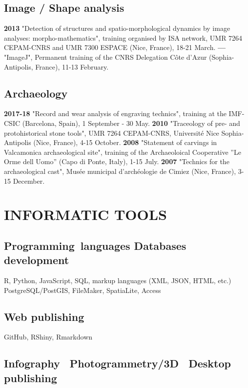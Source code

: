 \documentclass[11pt]{report} %
\begin{document}
\subsection*{Image / Shape analysis}

\textbf{2013 }"Detection of structures and spatio-morphological dynamics by image analyses: morpho-mathematics", training organised by ISA network, UMR 7264 CEPAM-CNRS and UMR 7300 ESPACE (Nice, France), 18-21 March.
\smallbreak
\textbf{---  }"ImageJ", Permanent training of the CNRS Delegation C\^{o}te d'Azur (Sophia-Antipolis, France), 11-13 February.

\subsection*{Archaeology}

\textbf{2017-18 } "Record and wear analysis of engraving technics", training at the IMF-CSIC (Barcelona, Spain), 1 September - 30 May.
\smallbreak
\textbf{2010 } "Traceology of pre- and protohistorical stone tools", UMR 7264 CEPAM-CNRS, Universit\'{e} Nice Sophia-Antipolis (Nice, France), 4-15 October.
\smallbreak
\textbf{2008 } "Statement of carvings in Valcamonica archaeological site", training of the Archaeoloical Cooperative ''Le Orme dell Uomo'' (Capo di Ponte, Italy), 1-15 July.
\smallbreak
\textbf{2007 } "Technics for the archaeological cast", Mus\'{e}e municipal d'arch\'{e}ologie de Cimiez (Nice, France), 3-15 December.

\section*{INFORMATIC TOOLS}

\subsection*{Programming~languages {\textbar} Databases development}

\textsf{R}, \textsf{Python}, \textsf{JavaScript}, SQL, markup languages (XML, JSON, HTML, etc.)~\textbf{{\textbar}} PostgreSQL/PostGIS, FileMaker, SpatiaLite, Access

\subsection*{Web publishing}

GitHub, RShiny, Rmarkdown 

\subsection*{Infography~{\textbar} Photogrammetry/3D~{\textbar} Desktop publishing}
\end{document}

